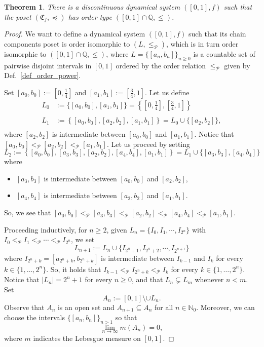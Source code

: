 \documentclass[pdflatex,sn-mathphys-num]{sn-jnl}
\theoremstyle{thmstyleone}%
\newtheorem{thm}{Theorem}
\theoremstyle{thmstyletwo}%
\theoremstyle{thmstylethree}%
\begin{document}
\begin{thm}\label{order_type_[0,1]}
There is a discontinuous dynamical system $([0,1],f)$ such that the poset $(\mathfrak{C}_f,\preceq)$ has order type $([0,1]\cap\mathbb{Q},\le)$.
\end{thm}
\begin{proof}
We want to define a dynamical system $([0,1],f)$ such that its chain components poset is order isomorphic to $(L,\leq_{\mathcal{P}})$, which is in turn order isomorphic to $([0,1]\cap \mathbb{Q}, \leq)$, where $L=\{[a_n,b_n]\}_{n\geq 0}$ is a countable set of pairwise disjoint intervals in $[0,1]$ ordered by the order relation $\leq_{\mathcal{P}}$ given by Def.~\ref{def_order_power}.

\noindent Set $[a_0,b_0]:=\left[0,\frac{1}{4}\right]$ and $[a_1,b_1]:=\left[\frac{3}{4},1\right]$. 
Let us define
\begin{align*}
L_0&:=\{[a_0,b_0],[a_1,b_1]\}=\left \{\left[0,\frac{1}{4}\right], \left[\frac{3}{4},1\right]\right \}\\
\\
L_1&:=\left\{[a_0,b_0], \left[a_2, b_2\right], [a_1,b_1]\right\}=L_0\cup\{[a_2,b_2]\},\\
\end{align*}
where $[a_2,b_2]$ is intermediate between $[a_0,b_0]$ and $[a_1,b_1]$. Notice that $[a_0,b_0] <_\mathcal{P} [a_2,b_2]<_\mathcal{P} [a_1,b_1]$.
Let us proceed by setting
\[
L_2:=\left\{[a_0,b_0],[a_3, b_3], [a_2,b_2],[a_4,b_4],[a_1,b_1]\right\}=L_1\cup\{[a_3,b_3],[a_4,b_4]\}
\]
where 
\begin{itemize}
\item $[a_3,b_3]$ is intermediate between $[a_0,b_0]$ and $[a_2,b_2]$, 
\item $[a_4,b_4]$ is intermediate between $[a_2,b_2]$ and $[a_1,b_1]$.
\end{itemize}
So, we see that $[a_0,b_0]<_\mathcal{P}[a_3,b_3]  <_\mathcal{P} [a_2,b_2]<_\mathcal{P}[a_4,b_4]<_\mathcal{P} [a_1,b_1]$.

\noindent Proceeding inductively, for $n\ge 2$, given $L_n=\{I_0, I_1,\cdots , I_{2^n}\}$ with $I_0<_\mathcal{P} I_1<_\mathcal{P}\cdots <_\mathcal{P} I_{2^n}$, we set
\[
L_{n+1}:=L_n\cup\{I_{2^n+1}, I_{2^n+2},\cdots , I_{2^{n+1}}\}
\]
where $I_{2^n+k}=[a_{2^n+k}, b_{2^n+k}]$ is intermediate between $I_{k-1}$ and $I_{k}$ for every $k\in\{1,\ldots,2^n\}$.
So, it holds that $I_{k-1} <_\mathcal{P} I_{2^n+k} <_\mathcal{P} I_k$ for every $k\in\{1,\ldots,2^n\}$.
Notice that $\left|L_n\right|=2^n+1$ for every $n\geq 0$, and that $L_n\subsetneq L_m$ whenever $n<m$.
Set 
$$
A_n:=[0,1]\setminus \cup L_n.
$$ 
Observe that $A_n$ is an open set and $A_{n+1}\subseteq A_{n}$ for all $n\in\mathbb{N}_0$. Moreover, we can choose the intervals $\{[a_n,b_n]\}_{n>1}$ so that 
\begin{equation}\label{eq_mis_compl}
    \lim_{n\to\infty} m(A_n)=0,
\end{equation}
where $m$ indicates the Lebesgue measure on $[0,1]$.


\end{proof}
\end{document}
